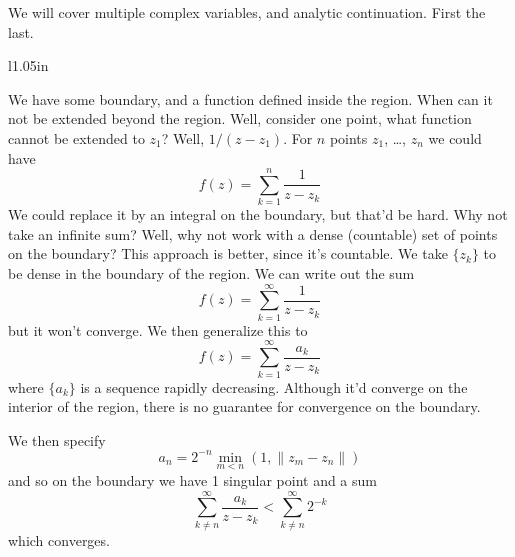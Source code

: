 We will cover multiple complex variables, and analytic
continuation. First the last.

\begin{wrapfigure}{l}{1.05in}
\vspace{-20pt}
\begin{center}
\end{center}
\vspace{-20pt}
\end{wrapfigure}
We have some boundary, and a function defined inside the
region. When can it not be extended beyond the region. Well,
consider one point, what function cannot be extended to $z_{1}$?
Well, $1/(z-z_{1})$. For $n$ points $z_{1}$, \dots, $z_{n}$ we
could have
\begin{equation}
f(z)=\sum_{k=1}^{n}\frac{1}{z-z_{k}}
\end{equation}
We could replace it by an integral on the boundary, but that'd be
hard. Why not take an infinite sum? Well, why not work with a
dense (countable) set of points on the boundary? This approach is
better, since it's countable. We take $\{z_{k}\}$ to be dense in
the boundary of the region. We can write out the sum
\begin{equation}
f(z)=\sum^{\infty}_{k=1}\frac{1}{z-z_{k}}
\end{equation}
but it won't converge. We then generalize this to
\begin{equation}
f(z)=\sum^{\infty}_{k=1}\frac{a_{k}}{z-z_{k}}
\end{equation}
where $\{a_{k}\}$ is a sequence rapidly decreasing. Although it'd
converge on the interior of the region, there is no guarantee for
convergence on the boundary.

We then specify
\begin{equation}
a_{n}=2^{-n}\min_{m<n}(1,\|z_{m}-z_{n}\|)
\end{equation}
and so on the boundary we have 1 singular point and a sum
\begin{equation}
\sum^{\infty}_{k\not=n}\frac{a_{k}}{z-z_{k}}<\sum^{\infty}_{k\not=n}2^{-k}
\end{equation}
which converges.
